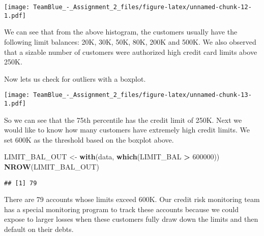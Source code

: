 \documentclass[]{article}
\newenvironment{Shaded}{\begin{snugshade}}{\end{snugshade}}
\newcommand{\KeywordTok}[1]{\textcolor[rgb]{0.13,0.29,0.53}{\textbf{#1}}}
\newcommand{\DataTypeTok}[1]{\textcolor[rgb]{0.13,0.29,0.53}{#1}}
\newcommand{\DecValTok}[1]{\textcolor[rgb]{0.00,0.00,0.81}{#1}}
\newcommand{\StringTok}[1]{\textcolor[rgb]{0.31,0.60,0.02}{#1}}
\newcommand{\OperatorTok}[1]{\textcolor[rgb]{0.81,0.36,0.00}{\textbf{#1}}}
\newcommand{\NormalTok}[1]{#1}
\begin{document}
\texttt{[image: TeamBlue\_-\_Assignment\_2\_files/figure-latex/unnamed-chunk-12-1.pdf]}

We can see that from the above histogram, the customers usually have the
following limit balances: 20K, 30K, 50K, 80K, 200K and 500K. We also
observed that a sizable number of customers were authorized high credit
card limits above 250K.

Now lets us check for outliers with a boxplot.

\begin{Shaded}
\end{Shaded}

\texttt{[image: TeamBlue\_-\_Assignment\_2\_files/figure-latex/unnamed-chunk-13-1.pdf]}

So we can see that the 75th percentile has the credit limit of 250K.
Next we would like to know how many customers have extremely high credit
limits. We set 600K as the threshold based on the boxplot above.

\begin{Shaded}
\begin{Highlighting}[]
\NormalTok{LIMIT_BAL_OUT <-}\StringTok{ }\KeywordTok{with}\NormalTok{(data, }\KeywordTok{which}\NormalTok{(LIMIT_BAL }\OperatorTok{>}\StringTok{ }\DecValTok{600000}\NormalTok{))}
\KeywordTok{NROW}\NormalTok{(LIMIT_BAL_OUT)}
\end{Highlighting}
\end{Shaded}

\begin{verbatim}
## [1] 79
\end{verbatim}

There are 79 accounts whose limits exceed 600K. Our credit risk
monitoring team has a special monitoring program to track these accounts
because we could expose to larger losses when these customers fully draw
down the limits and then default on their debts.
\end{document}
